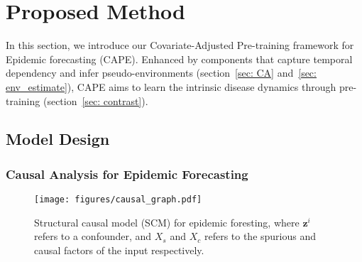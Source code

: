 \section{Proposed Method}



In this section, we introduce our Covariate-Adjusted Pre-training framework for Epidemic forecasting (CAPE). Enhanced by components that capture temporal dependency and infer pseudo-environments (section~\ref{sec: CA} and~\ref{sec: env_estimate}), CAPE aims to learn the intrinsic disease dynamics through pre-training (section~\ref{sec: contrast}).





\subsection{Model Design}
\subsubsection{Causal Analysis for Epidemic Forecasting}


\begin{figure}[t]
\centering
\texttt{[image: figures/causal\_graph.pdf]}
\caption{ Structural causal model (SCM) for epidemic foresting, where $\mathbf{z}^i$ refers to a confounder, and $X_s$ and $X_c$  refers to the spurious and causal factors of the input respectively. }
\label{fig: causal_graph}
\end{figure}

